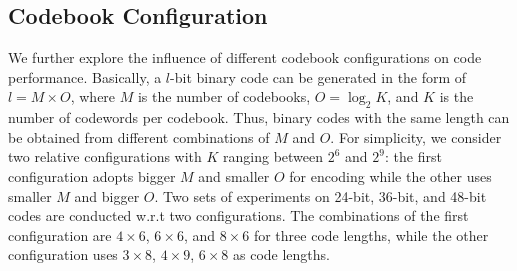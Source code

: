 \documentclass{elsarticle}
\begin{document}
\subsection{Codebook Configuration}
We further explore the influence of different codebook configurations on code performance. Basically, a $l$-bit binary code can be generated in the form of $l=M \times O$, where $M$ is the number of codebooks, $O=\log_2 K$, and $K$ is the number of codewords per codebook. Thus, binary codes with the same length can be obtained from different combinations of $M$ and $O$. For simplicity, we consider two relative configurations with $K$ ranging between $2^6$ and $2^9$: the first configuration adopts bigger $M$ and smaller $O$ for encoding while the other uses smaller $M$ and bigger $O$. Two sets of experiments on 24-bit, 36-bit, and 48-bit codes are conducted w.r.t two configurations. The combinations of the first configuration are $4 \times 6$, $6 \times 6$, and $8 \times 6$ for three code lengths, while the other configuration uses $3 \times 8$, $4 \times 9$, $6 \times 8$ as code lengths.

{\linespread{1.2}
\begin{table}[htbp]
    \centering
    \small
    \caption{Comparison of MAP ($\%$) results by different codebook configurations}
    \label{table:map_config}
\end{table}
}
\end{document}
